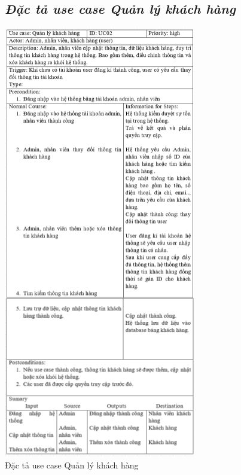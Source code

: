 \documentclass{report}
\begin{document}
\begin{figure}[htp]
    \subsection{\textit{Đặc tả use case Quản lý khách hàng}}
    \centering
    \includegraphics[scale = 1.2]{image/UC02.PNG}
    \caption{Đặc tả use case Quản lý khách hàng}
\end{figure}
\end{document}
